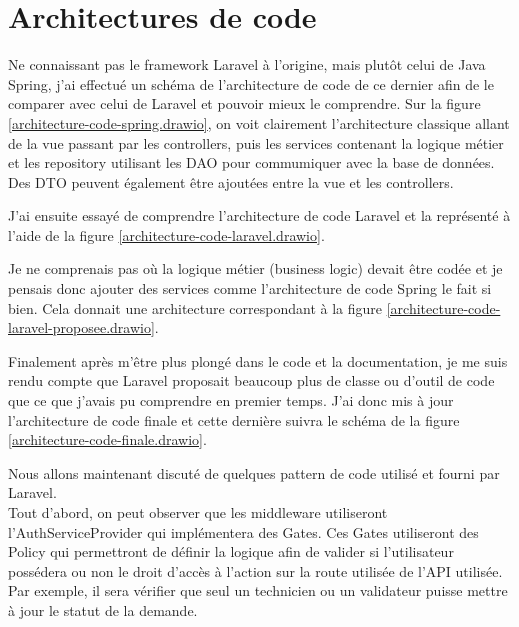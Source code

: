 \documentclass[
    iai, %
    il, %
]{heig-tb}
\begin{document}
\section{Architectures de code}

Ne connaissant pas le framework Laravel à l'origine, mais plutôt celui de Java Spring, j'ai effectué
un schéma de l'architecture de code de ce dernier afin de le comparer avec celui de Laravel et
pouvoir mieux le comprendre. Sur la figure \ref{architecture-code-spring.drawio}, on voit clairement
l'architecture classique allant de la vue passant par les controllers, puis les services contenant
la logique métier et les repository utilisant les DAO pour commumiquer avec la base de données. \\
Des DTO peuvent également être ajoutées entre la vue et les controllers.


J'ai ensuite essayé de comprendre l'architecture de code Laravel et la représenté à l'aide de la
figure \ref{architecture-code-laravel.drawio}.


Je ne comprenais pas où la logique métier (business logic) devait être codée et je pensais donc
ajouter des services comme l'architecture de code Spring le fait si bien. Cela donnait une
architecture correspondant à la figure \ref{architecture-code-laravel-proposee.drawio}.


Finalement après m'être plus plongé dans le code et la documentation, je me suis rendu compte que
Laravel proposait beaucoup plus de classe ou d'outil de code que ce que j'avais pu comprendre en
premier temps. J'ai donc mis à jour l'architecture de code finale et cette dernière suivra le schéma
de la figure \ref{architecture-code-finale.drawio}.

Nous allons maintenant discuté de quelques pattern de code utilisé et fourni par Laravel.\\
Tout d'abord, on peut observer que les middleware utiliseront l'AuthServiceProvider qui
implémentera des Gates. Ces Gates utiliseront des Policy qui permettront de définir la logique afin
de valider si l'utilisateur possédera ou non le droit d'accès à l'action sur la route utilisée de
l'API utilisée. Par exemple, il sera vérifier que seul un technicien ou un validateur puisse mettre
à jour le statut de la demande.
\end{document}
